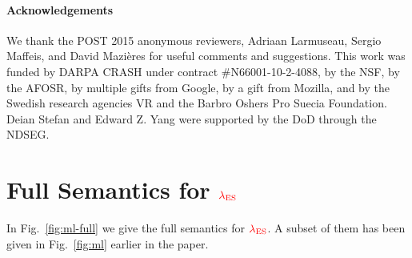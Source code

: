 \documentclass{llncs}
\newif\ifextended
\newcommand{\Red}[1]{{\color{red} #1}}
\begin{document}
{
\small
\paragraph{Acknowledgements}
We thank the POST 2015 anonymous reviewers,
Adriaan Larmuseau,
Sergio Maffeis, and
David Mazi\`eres
for useful comments and suggestions.
This work was funded by DARPA CRASH under contract \#N66001-10-2-4088,
by the NSF, by the AFOSR,
by multiple gifts from Google, by a gift from Mozilla,
and by the Swedish research agencies VR and the Barbro Oshers Pro
Suecia Foundation.
Deian Stefan and Edward Z. Yang were supported by the DoD through the
NDSEG.
}


{
\ifextended \else \frenchspacing\scriptsize
\setlength{\bibsep}{2pt}
\fi 
  
}

\ifextended
\clearpage
\balance
\appendix


\section{Full Semantics for \ensuremath{\Red{\lambda_{\text{ES}}}}}
\label{sec:app:semantics}

In Fig.~\ref{fig:ml-full} we give the full semantics for \ensuremath{\Red{\lambda_{\text{ES}}}}.  A subset
of them has been given in Fig.~\ref{fig:ml} earlier in the paper.
\end{document}
